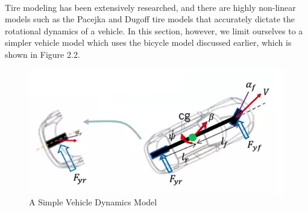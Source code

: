 \paragraph{}
Tire modeling has been extensively researched, and there are highly non-linear models such as the Pacejka and Dugoff tire models that accurately dictate the rotational dynamics of a vehicle. In this section, however, we limit ourselves to a simpler vehicle model which uses the bicycle model discussed earlier, which is shown in Figure 2.2.

\begin{figure}[H]\label{fig2.2}
\centering \includegraphics[scale = 1.2]{Images/vehicle_dynamics_model.png}
\caption{A Simple Vehicle Dynamics Model}
\end{figure}
